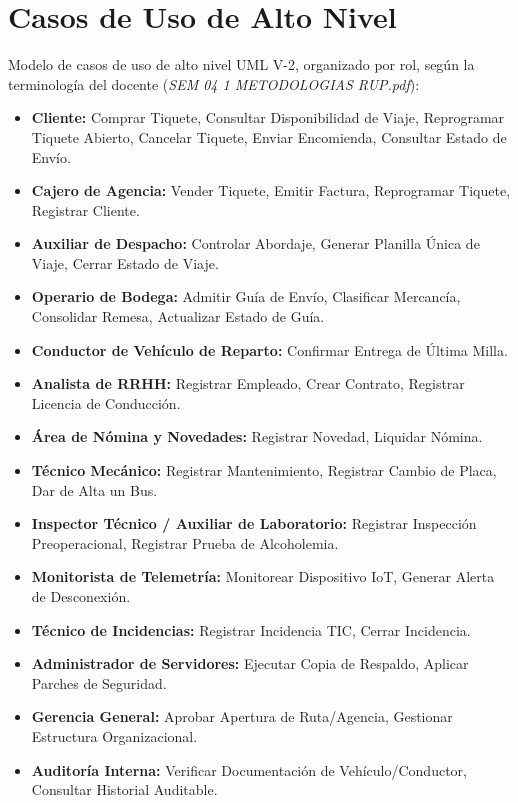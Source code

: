 \documentclass[11pt,a4paper]{article}
\begin{document}
\section{Casos de Uso de Alto Nivel}

Modelo de casos de uso de alto nivel UML V-2, organizado por rol, según la terminología del
docente (\emph{SEM 04 1 METODOLOGIAS RUP.pdf}):

\begin{itemize}[nosep]
  \item \textbf{Cliente:} Comprar Tiquete, Consultar Disponibilidad de Viaje, Reprogramar Tiquete Abierto, Cancelar Tiquete, Enviar Encomienda, Consultar Estado de Envío.
  \item \textbf{Cajero de Agencia:} Vender Tiquete, Emitir Factura, Reprogramar Tiquete, Registrar Cliente.
  \item \textbf{Auxiliar de Despacho:} Controlar Abordaje, Generar Planilla Única de Viaje, Cerrar Estado de Viaje.
  \item \textbf{Operario de Bodega:} Admitir Guía de Envío, Clasificar Mercancía, Consolidar Remesa, Actualizar Estado de Guía.
  \item \textbf{Conductor de Vehículo de Reparto:} Confirmar Entrega de Última Milla.
  \item \textbf{Analista de RRHH:} Registrar Empleado, Crear Contrato, Registrar Licencia de Conducción.
  \item \textbf{Área de Nómina y Novedades:} Registrar Novedad, Liquidar Nómina.
  \item \textbf{Técnico Mecánico:} Registrar Mantenimiento, Registrar Cambio de Placa, Dar de Alta un Bus.
  \item \textbf{Inspector Técnico / Auxiliar de Laboratorio:} Registrar Inspección Preoperacional, Registrar Prueba de Alcoholemia.
  \item \textbf{Monitorista de Telemetría:} Monitorear Dispositivo IoT, Generar Alerta de Desconexión.
  \item \textbf{Técnico de Incidencias:} Registrar Incidencia TIC, Cerrar Incidencia.
  \item \textbf{Administrador de Servidores:} Ejecutar Copia de Respaldo, Aplicar Parches de Seguridad.
  \item \textbf{Gerencia General:} Aprobar Apertura de Ruta/Agencia, Gestionar Estructura Organizacional.
  \item \textbf{Auditoría Interna:} Verificar Documentación de Vehículo/Conductor, Consultar Historial Auditable.
\end{itemize}
\end{document}
